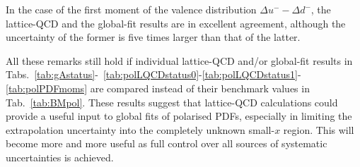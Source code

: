 In the case of the first moment of the valence distribution 
$\Delta u^--\Delta d^-$, the lattice-QCD and the global-fit results are 
in excellent agreement, although the uncertainty of the former is five times
larger than that of the latter.

All these remarks still hold if individual lattice-QCD and/or global-fit
results in Tabs.~\ref{tab:gAstatus}-~\ref{tab:polLQCDstatus0}-\ref{tab:polLQCDstatus1}-\ref{tab:polPDFmoms}
are compared instead of their benchmark values in Tab.~\ref{tab:BMpol}.
%
These results suggest that lattice-QCD calculations could provide a useful
input to global fits of polarised PDFs, especially in limiting the
extrapolation uncertainty into the completely unknown small-$x$ region.
%
This will become more and more useful as full control over all sources of
systematic uncertainties is achieved.
